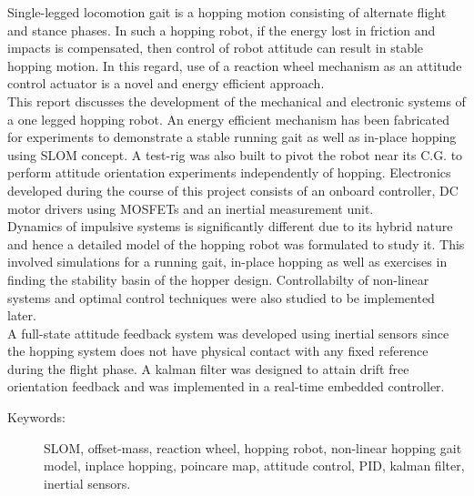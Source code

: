 \thispagestyle{plain}
\abstract
Single-legged locomotion gait is a hopping motion consisting of alternate flight and stance phases. In such a hopping robot, if the energy lost in friction and impacts is compensated, then control of robot attitude can result in stable hopping motion. In this regard, use of a reaction wheel mechanism as an attitude control actuator is a novel and energy efficient approach.\\

This report discusses the development of the mechanical and electronic systems of a one legged hopping robot. An energy efficient mechanism has been fabricated for experiments to demonstrate a stable running gait as well as in-place hopping using SLOM concept. A test-rig was also built to pivot the robot near its C.G. to perform attitude orientation experiments independently of hopping. Electronics developed during the course of this project consists of an onboard controller, DC motor drivers using MOSFETs and an inertial measurement unit.\\

Dynamics of impulsive systems is significantly different due to its hybrid nature and hence a detailed model of the hopping robot was formulated to study it. This involved simulations for a running gait, in-place hopping as well as exercises in finding the stability basin of the hopper design. Controllabilty of non-linear systems and optimal control techniques were also studied to be implemented later.\\

A full-state attitude feedback system was developed using inertial sensors since the hopping system does not have physical contact with any fixed reference during the flight phase. A kalman filter was designed to attain drift free orientation feedback and was implemented in a real-time embedded controller.

\vspace{1cm}
\begin{description}
  \item[Keywords:] SLOM, offset-mass, reaction wheel, hopping robot, non-linear hopping gait model, inplace hopping, poincare map, attitude control, PID, kalman filter, inertial sensors.
\end{description}